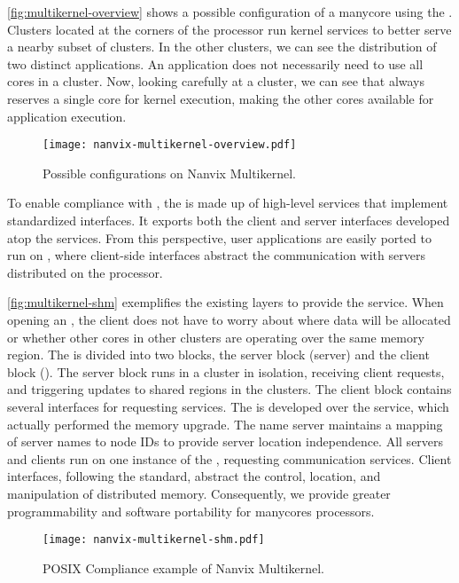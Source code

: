 		\autoref{fig:multikernel-overview} shows a possible configuration of a
		manycore using the \nanvixmultikernel.
		Clusters located at the corners of the processor run kernel services
		to better serve a nearby subset of clusters.
		In the other clusters, we can see the distribution of two distinct applications.
		An application does not necessarily need to use all cores in a cluster.
		Now, looking carefully at a cluster, we can see that \nanvixmicrokernel
		always reserves a single core for kernel execution, making the other cores
		available for application execution.

		\begin{figure}[!tb]
			\centering%
			\caption{Possible configurations on Nanvix Multikernel.}%
			\label{fig:multikernel-overview}%
			\texttt{[image: nanvix-multikernel-overview.pdf]}%
		\end{figure}

		To enable \nanvixos compliance with \posix, the \nanvixmultikernel is
		made up of high-level \os services that implement standardized interfaces.
		It exports both the client and server interfaces developed atop	the
		\nanvixmicrokernel services.
		From this perspective, user applications are easily ported to run on
		\nanvixmultikernel, where client-side interfaces abstract the communication
		with servers distributed on the processor.
		
		\autoref{fig:multikernel-shm} exemplifies the existing layers to provide
		the \shm service. When opening an \shm, the client does not have to worry
		about where data will be allocated or whether other cores in other clusters
		are operating over the same memory region.
		The \shm is divided into two blocks, the server block (\shm server) and the
		client block (\posix \shm). The server block runs in a cluster in isolation,
		receiving client requests, and triggering updates to shared regions in the
		clusters. The client block contains several interfaces for requesting services.
		The \shm is developed over the \rmem service, which actually performed
		the memory upgrade. The name server maintains a mapping of server names to
		node IDs to provide server location independence. All servers and clients
		run on one instance of the \nanvixmicrokernel, \eg requesting communication
		services. Client interfaces, following the \posix standard, abstract the
		control, location, and manipulation of distributed memory.
		Consequently, we provide greater programmability and software portability
		for manycores processors.

		\begin{figure}[!tb]
			\centering%
			\caption{POSIX Compliance example of Nanvix Multikernel.}%
			\label{fig:multikernel-shm}%
			\texttt{[image: nanvix-multikernel-shm.pdf]}%
		\end{figure}
